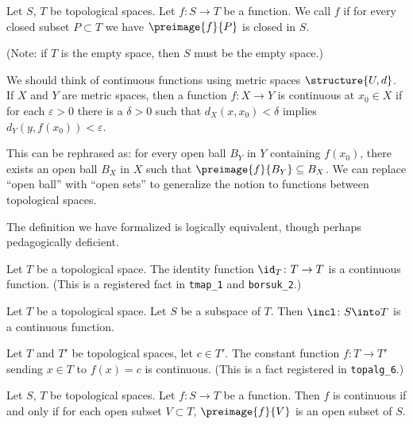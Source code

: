 \begin{definition}
Let $S$, $T$ be topological spaces. Let $f\colon S\to T$ be a function.
We call $f$  if for every closed subset $P\subset T$
we have $\preimage{f}{P}$ is closed in $S$.

(Note: if $T$ is the empty space, then $S$ must be the empty space.)
\end{definition}

\begin{remark}
We should think of continuous functions using metric spaces $\structure{U,d}$.
If $X$ and $Y$ are metric spaces, then a function $f\colon X\to Y$ is
continuous at $x_{0}\in X$ if for each $\varepsilon>0$ there is a $\delta>0$ such that 
$d_{X}(x,x_{0})<\delta$ implies $d_{Y}(y,f(x_{0}))<\varepsilon$.

This can be rephrased as: for every open ball $B_{Y}$ in $Y$
containing $f(x_{0})$, there exists an open ball $B_{X}$ in $X$ such
that $\preimage{f}{B_{Y}}\subset B_{X}$. We can replace ``open ball''
with ``open sets'' to generalize the notion to functions between
topological spaces.

The definition we have formalized is logically equivalent, though
perhaps pedagogically deficient.
\end{remark}

\begin{example}
Let $T$ be a topological space. The identity function $\id_{T}\colon T\to T$
is a continuous function. (This is a registered fact in
\texttt{tmap\_1} and \texttt{borsuk\_2}.)
\end{example}

\begin{example}\label{tmap_1:87}
Let $T$ be a topological space.
Let $S$ be a subspace of $T$.
Then $\incl\colon S\into T$ is a continuous function.
\end{example}

\begin{example}
Let $T$ and $T'$ be topological spaces, let $c\in T'$.
The constant function $f\colon T\to T'$ sending $x\in T$ to $f(x)=c$
is continuous. (This is a fact registered in \texttt{topalg\_6}.)
\end{example}

\begin{theorem}
Let $S$, $T$ be topological spaces. Let $f\colon S\to T$ be a function.
Then $f$ is continuous if and only if for each open subset $V\subset T$,
$\preimage{f}{V}$ is an open subset of $S$.
\end{theorem}

